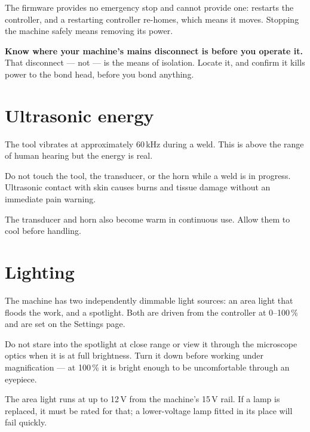 The firmware provides no emergency stop and cannot provide one: 
restarts the controller, and a restarting controller re-homes, which means it
moves. Stopping the machine safely means removing its power.

\begin{wbwarning}
\textbf{Know where your machine's mains disconnect is before you operate it.}
That disconnect --- not  --- is the means of isolation. Locate
it, and confirm it kills power to the bond head, before you bond anything.
\end{wbwarning}


\section{Ultrasonic energy}

The tool vibrates at approximately 60\,kHz during a weld. This is above the
range of human hearing but the energy is real.

\begin{wbwarning}
Do not touch the tool, the transducer, or the horn while a weld is in progress.
Ultrasonic contact with skin causes burns and tissue damage without an
immediate pain warning.
\end{wbwarning}

The transducer and horn also become warm in continuous use. Allow them to cool
before handling.

\section{Lighting}

The machine has two independently dimmable light sources: an area light that
floods the work, and a spotlight. Both are driven from the controller at
0--100\,\% and are set on the Settings page.

\begin{wbwarning}
Do not stare into the spotlight at close range or view it through the
microscope optics when it is at full brightness. Turn it down before working
under magnification --- at 100\,\% it is bright enough to be uncomfortable
through an eyepiece.
\end{wbwarning}

\begin{wbnote}
The area light runs at up to 12\,V from the machine's 15\,V rail. If a lamp is
replaced, it must be rated for that; a lower-voltage lamp fitted in its place
will fail quickly.
\end{wbnote}

